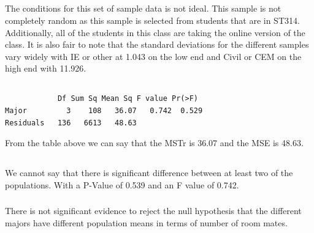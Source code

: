 \documentclass[letterpaper, onecolumn,10pt]{IEEEtran}
\begin{document}
            \subsection{}
            The conditions for this set of sample data is not ideal. This sample is not completely random as this sample is selected from students that are in ST314. Additionally, all of the students in this class are taking the online version of the class. It is also fair to note that the standard deviations for the different samples vary widely with IE or other at 1.043 on the low end and Civil or CEM on the high end with 11.926.\\
            
            \subsection{}
            \begin{lstlisting}
            Df Sum Sq Mean Sq F value Pr(>F)
Major         3    108   36.07   0.742  0.529
Residuals   136   6613   48.63   
            \end{lstlisting}
            
            From the table above we can say that the MSTr is 36.07 and the MSE is 48.63.\\ 
            
            \subsection{}
                \subsubsection{}
                We cannot say that there is significant difference between at least two of the populations. With a P-Value of 0.539 and an F value of 0.742.\\
                
                \subsubsection{}
                There is not significant evidence to reject the null hypothesis that the different majors have different population means in terms of number of room mates.\\
            \subsection{}
\end{document}
